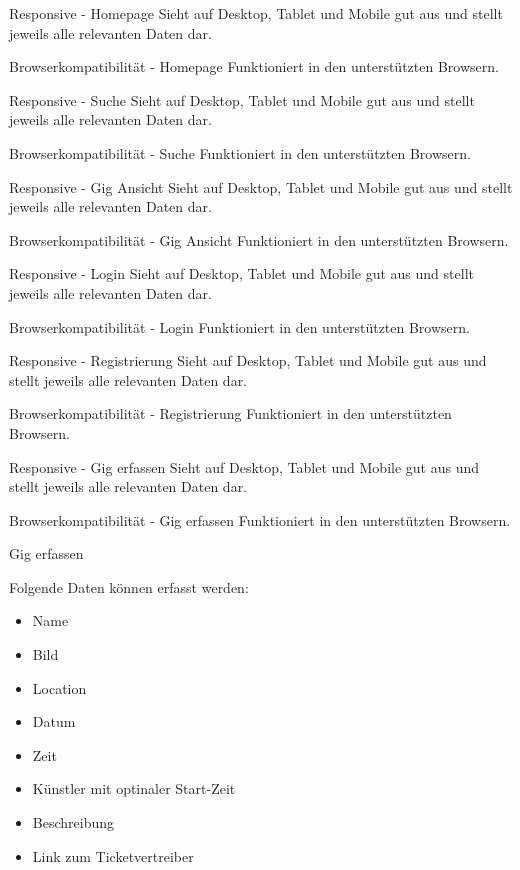 \clearpage

\acceptancetest
  {Responsive - Homepage}
  {Sieht auf Desktop, Tablet und Mobile gut aus und stellt jeweils alle relevanten Daten dar.}

\acceptancetest
  {Browserkompatibilität - Homepage}
  {Funktioniert in den unterstützten Browsern.}

\clearpage

\acceptancetest
  {Responsive - Suche}
  {Sieht auf Desktop, Tablet und Mobile gut aus und stellt jeweils alle relevanten Daten dar.}

\acceptancetest
  {Browserkompatibilität - Suche}
  {Funktioniert in den unterstützten Browsern.}

\clearpage

\acceptancetest
  {Responsive - Gig Ansicht}
  {Sieht auf Desktop, Tablet und Mobile gut aus und stellt jeweils alle relevanten Daten dar.}

\acceptancetest
  {Browserkompatibilität - Gig Ansicht}
  {Funktioniert in den unterstützten Browsern.}

\clearpage

\acceptancetest
  {Responsive - Login}
  {Sieht auf Desktop, Tablet und Mobile gut aus und stellt jeweils alle relevanten Daten dar.}

\acceptancetest
  {Browserkompatibilität - Login}
  {Funktioniert in den unterstützten Browsern.}

\clearpage

\acceptancetest
  {Responsive - Registrierung}
  {Sieht auf Desktop, Tablet und Mobile gut aus und stellt jeweils alle relevanten Daten dar.}

\acceptancetest
  {Browserkompatibilität - Registrierung}
  {Funktioniert in den unterstützten Browsern.}

\clearpage

\acceptancetest
  {Responsive - Gig erfassen}
  {Sieht auf Desktop, Tablet und Mobile gut aus und stellt jeweils alle relevanten Daten dar.}

\acceptancetest
  {Browserkompatibilität - Gig erfassen}
  {Funktioniert in den unterstützten Browsern.}

\clearpage

\acceptancetest
  {Gig erfassen}
  {Folgende Daten können erfasst werden:
  \begin{itemize}
    \tightlist{}
    \item{} Name
    \item{} Bild
    \item{} Location
    \item{} Datum
    \item{} Zeit
    \item{} Künstler mit optinaler Start-Zeit
    \item{} Beschreibung
    \item{} Link zum Ticketvertreiber
  \end{itemize}}

